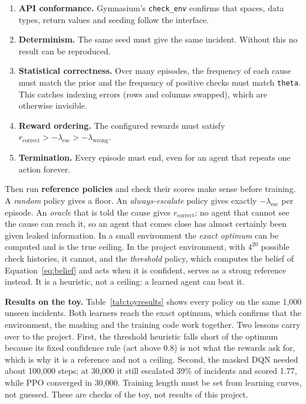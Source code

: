 \documentclass[11pt,a4paper]{article}
\begin{document}


\begin{enumerate}
  \item \textbf{API conformance.} Gymnasium's \texttt{check\_env} confirms that spaces, data types, return values and seeding follow the interface.
  \item \textbf{Determinism.} The same seed must give the same incident. Without this no result can be reproduced.
  \item \textbf{Statistical correctness.} Over many episodes, the frequency of each cause must match the prior and the frequency of positive checks must match \texttt{theta}. This catches indexing errors (rows and columns swapped), which are otherwise invisible.
  \item \textbf{Reward ordering.} The configured rewards must satisfy $r_{\text{correct}} > -\lambda_{\text{esc}} > -\lambda_{\text{wrong}}$.
  \item \textbf{Termination.} Every episode must end, even for an agent that repeats one action forever.
\end{enumerate}

Then run \textbf{reference policies} and check their scores make sense before training. A \emph{random} policy gives a floor. An \emph{always-escalate} policy gives exactly $-\lambda_{\text{esc}}$ per episode. An \emph{oracle} that is told the cause gives $r_{\text{correct}}$; no agent that cannot see the cause can reach it, so an agent that comes close has almost certainly been given leaked information. In a small environment the \emph{exact optimum} can be computed and is the true ceiling. In the project environment, with $4^{20}$ possible check histories, it cannot, and the \emph{threshold} policy, which computes the belief of Equation~\eqref{eq:belief} and acts when it is confident, serves as a strong reference instead. It is a heuristic, not a ceiling: a learned agent can beat it.

\textbf{Results on the toy.} Table~\ref{tab:toyresults} shows every policy on the same 1{,}000 unseen incidents. Both learners reach the exact optimum, which confirms that the environment, the masking and the training code work together. Two lessons carry over to the project. First, the threshold heuristic falls short of the optimum because its fixed confidence rule (act above 0.8) is not what the rewards ask for, which is why it is a reference and not a ceiling. Second, the masked DQN needed about 100{,}000 steps; at 30{,}000 it still escalated 39\% of incidents and scored 1.77, while PPO converged in 30{,}000. Training length must be set from learning curves, not guessed. These are checks of the toy, not results of this project.
\end{document}

